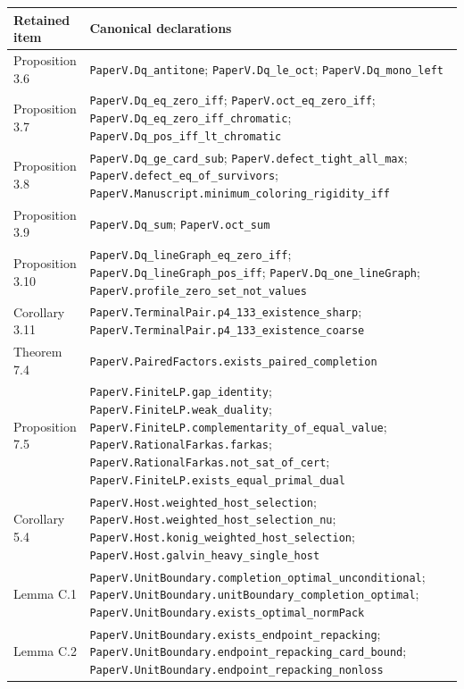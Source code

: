 \documentclass[english,11pt,a4paper]{article}
\newcounter{none}
\begin{document}
{\def\LTcaptype{none} %
\begin{longtable}[]{@{}
  >{\raggedright\arraybackslash}p{}
  >{\raggedright\arraybackslash}p{}@{}}
\toprule\noalign{}
\begin{minipage}[b]{\linewidth}\raggedright
Retained item
\end{minipage} & \begin{minipage}[b]{\linewidth}\raggedright
Canonical declarations
\end{minipage} \\
\midrule\noalign{}
\endhead
\bottomrule\noalign{}
\endlastfoot
Proposition 3.6 & \nolinkurl{PaperV.Dq_antitone};
\nolinkurl{PaperV.Dq_le_oct}; \nolinkurl{PaperV.Dq_mono_left} \\
Proposition 3.7 & \nolinkurl{PaperV.Dq_eq_zero_iff};
\nolinkurl{PaperV.oct_eq_zero_iff};
\nolinkurl{PaperV.Dq_eq_zero_iff_chromatic};
\nolinkurl{PaperV.Dq_pos_iff_lt_chromatic} \\
Proposition 3.8 & \nolinkurl{PaperV.Dq_ge_card_sub};
\nolinkurl{PaperV.defect_tight_all_max};
\nolinkurl{PaperV.defect_eq_of_survivors};
\nolinkurl{PaperV.Manuscript.minimum_coloring_rigidity_iff} \\
Proposition 3.9 & \texttt{PaperV.Dq\_sum}; \texttt{PaperV.oct\_sum} \\
Proposition 3.10 & \nolinkurl{PaperV.Dq_lineGraph_eq_zero_iff};
\nolinkurl{PaperV.Dq_lineGraph_pos_iff};
\nolinkurl{PaperV.Dq_one_lineGraph};
\nolinkurl{PaperV.profile_zero_set_not_values} \\
Corollary 3.11 & \nolinkurl{PaperV.TerminalPair.p4_133_existence_sharp};
\nolinkurl{PaperV.TerminalPair.p4_133_existence_coarse} \\
Theorem 7.4 &
\nolinkurl{PaperV.PairedFactors.exists_paired_completion} \\
Proposition 7.5 & \nolinkurl{PaperV.FiniteLP.gap_identity};
\nolinkurl{PaperV.FiniteLP.weak_duality};
\nolinkurl{PaperV.FiniteLP.complementarity_of_equal_value};
\nolinkurl{PaperV.RationalFarkas.farkas};
\nolinkurl{PaperV.RationalFarkas.not_sat_of_cert};
\nolinkurl{PaperV.FiniteLP.exists_equal_primal_dual} \\
Corollary 5.4 & \nolinkurl{PaperV.Host.weighted_host_selection};
\nolinkurl{PaperV.Host.weighted_host_selection_nu};
\nolinkurl{PaperV.Host.konig_weighted_host_selection};
\nolinkurl{PaperV.Host.galvin_heavy_single_host} \\
Lemma C.1 &
\nolinkurl{PaperV.UnitBoundary.completion_optimal_unconditional};
\nolinkurl{PaperV.UnitBoundary.unitBoundary_completion_optimal};
\nolinkurl{PaperV.UnitBoundary.exists_optimal_normPack} \\
Lemma C.2 & \nolinkurl{PaperV.UnitBoundary.exists_endpoint_repacking};
\nolinkurl{PaperV.UnitBoundary.endpoint_repacking_card_bound};
\nolinkurl{PaperV.UnitBoundary.endpoint_repacking_nonloss} \\
\end{longtable}
}
\end{document}
